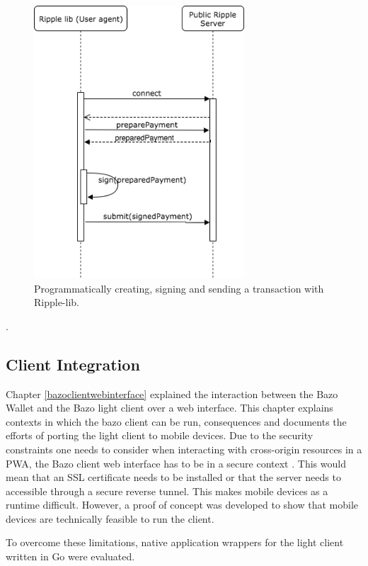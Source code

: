 \begin{figure}
\centering
\includegraphics[width=0.7\textwidth]{diagrams/ripplelibSendTX.png}
\caption{\label{fig:ripplesendTx}Programmatically creating, signing and sending a transaction with Ripple-lib\cite{ripplelib}.}
\end{figure}.


\subsection{Client Integration}

Chapter \ref{bazoclientwebinterface} explained the interaction between the Bazo Wallet and the Bazo light client over a web interface.
This chapter explains contexts in which the bazo client can be run, consequences and documents the efforts of porting the light client to mobile devices.
Due to the security constraints one needs to consider when interacting with cross-origin resources in a PWA, the Bazo client web interface has to be in a secure context \cite{securitychrome}. This would mean that an SSL certificate needs to be installed or that the server needs to accessible through a secure reverse tunnel.
This makes mobile devices as a runtime difficult. However, a proof of concept was developed to show that mobile devices are technically feasible to run the client. 

To overcome these limitations, native application wrappers for the light client written in Go were evaluated. 


